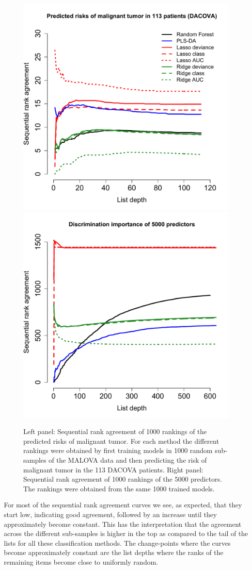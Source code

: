 \documentclass[12pt,a4paper]{article}
\theoremstyle{plain}
\begin{document}
\begin{figure}[htbp]
\begin{center}
\includegraphics[width=.49\textwidth]{pics/riskAgreementPlot}%
\includegraphics[width=.49\textwidth]{pics/predictorAgreementPlot}
\end{center}
\caption{Left panel: Sequential rank agreement of 1000 rankings of the
  predicted risks of malignant tumor. For each method the different
  rankings were obtained by first training models in 1000 random
  sub-samples of the MALOVA data and then predicting the risk of
  malignant tumor in the 113 DACOVA patients. Right panel: Sequential
  rank agreement of 1000 rankings of the 5000 predictors. The rankings
  were obtained from the same 1000 trained models.}
 \label{fig:app1}
\end{figure}

For most of the sequential rank agreement curves we see, as expected,
that they start low, indicating good agreement, followed by an
increase until they approximately become constant. This has the
interpretation that the agreement across the different sub-samples is
higher in the top as compared to the tail of the lists for all these
classification methods. The change-points where the curves become
approximately constant are the list depths where the ranks of the
remaining items become close to uniformly random.
\end{document}
